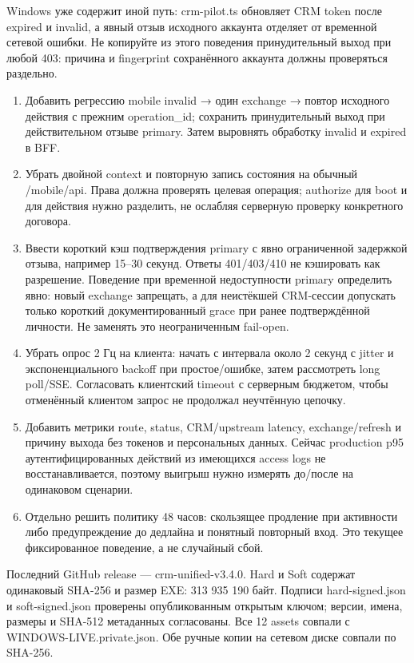 \documentclass[12pt,a4paper]{article}
\newcommand{\subhead}[1]{\par\vspace{4pt}{\large\sffamily\bfseries\color{accent}#1\par}\nopagebreak}
\begin{document}
Windows уже содержит иной путь: {\small\ttfamily crm-\allowbreak{}pilot.\allowbreak{}ts} обновляет CRM token после expired и invalid, а явный отзыв исходного аккаунта отделяет от временной сетевой ошибки. Не копируйте из этого поведения принудительный выход при любой 403: причина и fingerprint сохранённого аккаунта должны проверяться раздельно.\par
\subhead{Порядок устранения}
\begin{enumerate}
\item Добавить регрессию mobile invalid {\sffamily →} один exchange {\sffamily →} повтор исходного действия с прежним operation\_id; сохранить принудительный выход при действительном отзыве primary. Затем выровнять обработку invalid и expired в BFF.
\item Убрать двойной {\small\ttfamily context} и повторную запись состояния на обычный {\small\ttfamily /\allowbreak{}mobile/\allowbreak{}api}. Права должна проверять целевая операция; {\small\ttfamily authorize} для boot и для действия нужно разделить, не ослабляя серверную проверку конкретного договора.
\item Ввести короткий кэш подтверждения primary с явно ограниченной задержкой отзыва, например 15–30 секунд. Ответы 401/403/410 не кэшировать как разрешение. Поведение при временной недоступности primary определить явно: новый exchange запрещать, а для неистёкшей CRM-сессии допускать только короткий документированный grace при ранее подтверждённой личности. Не заменять это неограниченным fail-open.
\item Убрать опрос 2 Гц на клиента: начать с интервала около 2 секунд с jitter и экспоненциального backoff при простое/ошибке, затем рассмотреть long poll/SSE. Согласовать клиентский timeout с серверным бюджетом, чтобы отменённый клиентом запрос не продолжал неучтённую цепочку.
\item Добавить метрики route, status, CRM/upstream latency, exchange/refresh и причину выхода без токенов и персональных данных. Сейчас production p95 аутентифицированных действий из имеющихся access logs не восстанавливается, поэтому выигрыш нужно измерять до/после на одинаковом сценарии.
\item Отдельно решить политику 48 часов: скользящее продление при активности либо предупреждение до дедлайна и понятный повторный вход. Это текущее фиксированное поведение, а не случайный сбой.
\end{enumerate}
\subhead{Единая поставка}
Последний GitHub release — {\small\ttfamily crm-\allowbreak{}unified-\allowbreak{}v3.\allowbreak{}4.\allowbreak{}0}. Hard и Soft содержат одинаковый SHA-256 и размер EXE: 313 935 190 байт. Подписи {\small\ttfamily hard-\allowbreak{}signed.\allowbreak{}json} и {\small\ttfamily soft-\allowbreak{}signed.\allowbreak{}json} проверены опубликованным открытым ключом; версии, имена, размеры и SHA-512 метаданных согласованы. Все 12 assets совпали с {\small\ttfamily WINDOWS-\allowbreak{}LIVE.\allowbreak{}private.\allowbreak{}json}. Обе ручные копии на сетевом диске совпали по SHA-256.\par
\end{document}
